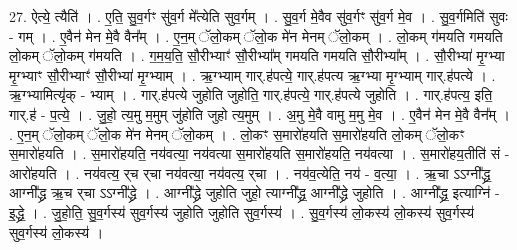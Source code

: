 \documentclass[17pt]{extarticle}
\begin{document}
27. ऐत्ये॒ त्यैति॑ । . ए॒ति॒ सु॒व॒र्गꣳ सु॑व॒र्ग मे᳚त्येति सुव॒र्गम् । . सु॒व॒र्ग मे॒वैव सु॑व॒र्गꣳ सु॑व॒र्ग मे॒व । . सु॒व॒र्गमिति॑ सुवः - गम् । . ए॒वैन॑ मेन मे॒वै वैन᳚म् । . ए॒न॒म् ॅलो॒कम् ॅलो॒क मे॑न मेनम् ॅलो॒कम् । . लो॒कम् ग॑मयति गमयति लो॒कम् ॅलो॒कम् ग॑मयति । . ग॒म॒य॒ति॒ सौ॒रीभ्याꣳ॑ सौ॒रीभ्या᳚म् गमयति गमयति सौ॒रीभ्या᳚म् । . सौ॒रीभ्या॑ मृ॒ग्भ्या मृ॒ग्भ्याꣳ सौ॒रीभ्याꣳ॑ सौ॒रीभ्या॑ मृ॒ग्भ्याम् । . ऋ॒ग्भ्याम् गार्.ह॑पत्ये॒ गार्.ह॑पत्य ऋ॒ग्भ्या मृ॒ग्भ्याम् गार्.ह॑पत्ये । . ऋ॒ग्भ्यामित्यृ॑क् - भ्याम् । . गार्.ह॑पत्ये जुहोति जुहोति॒ गार्.ह॑पत्ये॒ गार्.ह॑पत्ये जुहोति । . गार्.ह॑पत्य॒ इति॒ गार्.ह॑ - प॒त्ये॒ । . जु॒हो॒ त्य॒मु म॒मुम् जु॑होति जुहो त्य॒मुम् । . अ॒मु मे॒वै वामु म॒मु मे॒व । . ए॒वैन॑ मेन मे॒वै वैन᳚म् । . ए॒न॒म् ॅलो॒कम् ॅलो॒क मे॑न मेनम् ॅलो॒कम् । . लो॒कꣳ स॒मारो॑हयति स॒मारो॑हयति लो॒कम् ॅलो॒कꣳ स॒मारो॑हयति । . स॒मारो॑हयति॒ नय॑वत्या॒ नय॑वत्या स॒मारो॑हयति स॒मारो॑हयति॒ नय॑वत्या । . स॒मारो॑हय॒तीति॑ सं - आरो॑हयति । . नय॑वत्य॒ र्‌च र्‌चा नय॑वत्या॒ नय॑वत्य॒ र्‌चा । . नय॑व॒त्येति॒ नय॑ - व॒त्या॒ । . ऋ॒चा ऽऽग्नी᳚द्ध्र॒ आग्नी᳚द्ध्र ऋ॒च र्‌चा ऽऽग्नी᳚द्ध्रे । . आग्नी᳚द्ध्रे जुहोति जुहो॒ त्याग्नी᳚द्ध्र॒ आग्नी᳚द्ध्रे जुहोति । . आग्नी᳚द्ध्र॒ इत्याग्नि॑ - इ॒द्ध्रे॒ । . जु॒हो॒ति॒ सु॒व॒र्गस्य॑ सुव॒र्गस्य॑ जुहोति जुहोति सुव॒र्गस्य॑ । . सु॒व॒र्गस्य॑ लो॒कस्य॑ लो॒कस्य॑ सुव॒र्गस्य॑ सुव॒र्गस्य॑ लो॒कस्य॑ । \newline
\end{document}

